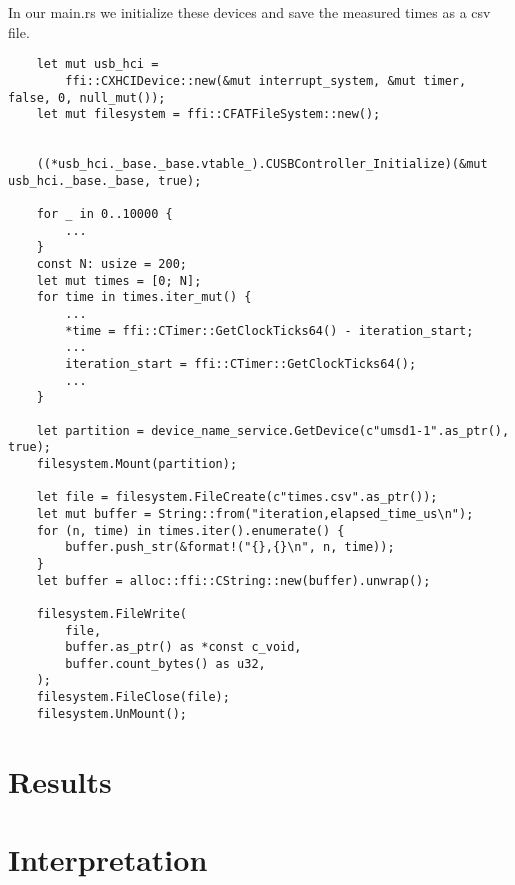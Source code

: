 In our main.rs we initialize these devices and save the measured times as a csv file.
\begin{lstlisting}
    let mut usb_hci =
        ffi::CXHCIDevice::new(&mut interrupt_system, &mut timer, false, 0, null_mut());
    let mut filesystem = ffi::CFATFileSystem::new();


    ((*usb_hci._base._base.vtable_).CUSBController_Initialize)(&mut usb_hci._base._base, true);

    for _ in 0..10000 {
        ...
    }
    const N: usize = 200;
    let mut times = [0; N];
    for time in times.iter_mut() {
        ...
        *time = ffi::CTimer::GetClockTicks64() - iteration_start;
        ...
        iteration_start = ffi::CTimer::GetClockTicks64();
        ...
    }

    let partition = device_name_service.GetDevice(c"umsd1-1".as_ptr(), true);
    filesystem.Mount(partition);

    let file = filesystem.FileCreate(c"times.csv".as_ptr());
    let mut buffer = String::from("iteration,elapsed_time_us\n");
    for (n, time) in times.iter().enumerate() {
        buffer.push_str(&format!("{},{}\n", n, time));
    }
    let buffer = alloc::ffi::CString::new(buffer).unwrap();

    filesystem.FileWrite(
        file,
        buffer.as_ptr() as *const c_void,
        buffer.count_bytes() as u32,
    );
    filesystem.FileClose(file);
    filesystem.UnMount();
\end{lstlisting}

\section{Results}
\label{sec:experiments:results}

\begin{table}
    \label{tab:measurments}
\end{table}



\section{Interpretation}

\begin{comment}
Measure iteration time over x iterations.
Derive average, minimal and maximal iteration times.
Look at variance 
\end{comment}
